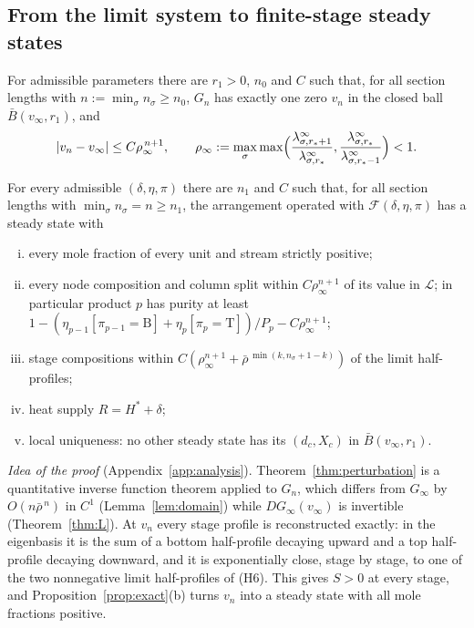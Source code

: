 \documentclass[11pt,a4paper]{report}
\newcommand{\cL}{\mathcal L}
\newcommand{\cF}{\mathcal F}
\newcommand{\Hs}{H^{*}}
\newcommand{\Ts}{\mathrm T}
\newcommand{\Bs}{\mathrm B}
\begin{document}
\subsection{From the limit system to finite-stage steady states}\label{sec:analysis}

\begin{theorem}\label{thm:perturbation}
For admissible parameters there are \(r_1>0\), \(n_0\) and \(C\) such that, for all section lengths with \(n:=\min_\sigma n_\sigma\ge n_0\),
\(G_n\) has exactly one zero \(v_n\) in the closed ball \(\bar B(v_\infty,r_1)\), and
\[|v_n-v_\infty|\le C\rho_\infty^{\,n+1},\qquad
\rho_\infty:=\max_\sigma\max\Bigl(\frac{\lambda^\infty_{\sigma,r_*+1}}{\lambda^\infty_{\sigma,r_*}},\frac{\lambda^\infty_{\sigma,r_*}}{\lambda^\infty_{\sigma,r_*-1}}\Bigr)<1 .\]
\end{theorem}

\begin{theorem}\label{thm:near}
For every admissible \((\delta,\eta,\pi)\) there are \(n_1\) and \(C\) such that, for all section lengths with
\(\min_\sigma n_\sigma=n\ge n_1\), the arrangement operated with \(\cF(\delta,\eta,\pi)\) has a steady state with
\begin{enumerate}[(i)]
\item every mole fraction of every unit and stream strictly positive;
\item every node composition and column split within \(C\rho_\infty^{n+1}\) of its value in \(\cL\); in particular product \(p\) has
purity at least \(1-(\eta_{p-1}[\pi_{p-1}=\Bs]+\eta_p[\pi_p=\Ts])/P_p-C\rho_\infty^{n+1}\);
\item stage compositions within \(C(\rho_\infty^{n+1}+\bar\rho^{\,\min(k,n_\sigma+1-k)})\) of the limit half-profiles;
\item heat supply \(R=\Hs+\delta\);
\item local uniqueness: no other steady state has its \((d_c,X_c)\) in \(\bar B(v_\infty,r_1)\).
\end{enumerate}
\end{theorem}

\emph{Idea of the proof} (Appendix~\ref{app:analysis}). Theorem~\ref{thm:perturbation} is a quantitative inverse function theorem
applied to \(G_n\), which differs from \(G_\infty\) by \(O(n\bar\rho^{\,n})\) in \(C^1\) (Lemma~\ref{lem:domain}) while \(DG_\infty(v_\infty)\)
is invertible (Theorem~\ref{thm:L}). At \(v_n\) every stage profile is reconstructed exactly: in the eigenbasis it is the sum of
a bottom half-profile decaying upward and a top half-profile decaying downward, and it is exponentially close, stage by
stage, to one of the two nonnegative limit half-profiles of (H6). This gives \(S>0\) at every stage, and
Proposition~\ref{prop:exact}(b) turns \(v_n\) into a steady state with all mole fractions positive.
\end{document}
